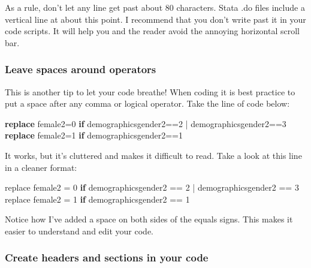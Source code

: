 \documentclass[
]{book}
\newenvironment{Shaded}{\begin{snugshade}}{\end{snugshade}}
\newcommand{\ControlFlowTok}[1]{\textcolor[rgb]{0.13,0.29,0.53}{\textbf{#1}}}
\newcommand{\DecValTok}[1]{\textcolor[rgb]{0.00,0.00,0.81}{#1}}
\newcommand{\KeywordTok}[1]{\textcolor[rgb]{0.13,0.29,0.53}{\textbf{#1}}}
\newcommand{\NormalTok}[1]{#1}
\newcommand{\OtherTok}[1]{\textcolor[rgb]{0.56,0.35,0.01}{#1}}
\newcommand{\SpecialCharTok}[1]{\textcolor[rgb]{0.00,0.00,0.00}{#1}}
\begin{document}
As a rule, don't let any line get past about 80 characters. Stata .do files include a
vertical line at about this point. I recommend that you don't write past it in
your code scripts. It will help you and the reader avoid the annoying horizontal scroll bar.

\hypertarget{leave-spaces-around-operators}{%
\subsubsection*{Leave spaces around operators}\label{leave-spaces-around-operators}}

This is another tip to let your code breathe! When coding it is best practice to
put a space after any comma or logical operator. Take the line of code below:

\begin{Shaded}
\begin{Highlighting}[]
\KeywordTok{replace}\NormalTok{ female2=0 }\KeywordTok{if}\NormalTok{ demographicsgender2==2 | demographicsgender2==3}
\KeywordTok{replace}\NormalTok{ female2=1 }\KeywordTok{if}\NormalTok{ demographicsgender2==1}
\end{Highlighting}
\end{Shaded}

It works, but it's cluttered and makes it difficult to read. Take a look at this
line in a cleaner format:

\begin{Shaded}
\begin{Highlighting}[]
\NormalTok{replace female2 }\OtherTok{=} \DecValTok{0} \ControlFlowTok{if}\NormalTok{ demographicsgender2 }\SpecialCharTok{==} \DecValTok{2} \SpecialCharTok{|}\NormalTok{ demographicsgender2 }\SpecialCharTok{==} \DecValTok{3}
\NormalTok{replace female2 }\OtherTok{=} \DecValTok{1} \ControlFlowTok{if}\NormalTok{ demographicsgender2 }\SpecialCharTok{==} \DecValTok{1}
\end{Highlighting}
\end{Shaded}

Notice how I've added a space on both sides of the equals signs. This makes it easier to understand and edit your code.

\hypertarget{create-headers-and-sections-in-your-code}{%
\subsubsection*{Create headers and sections in your code}\label{create-headers-and-sections-in-your-code}}
\end{document}
